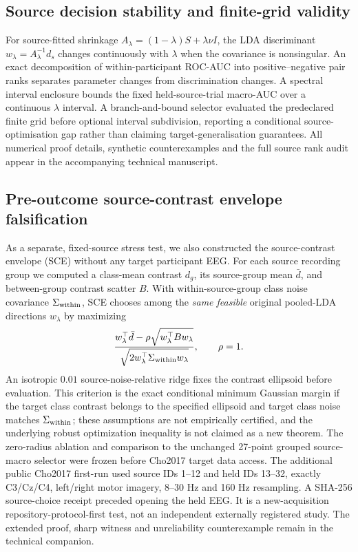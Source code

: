 \documentclass[11pt,a4paper]{article}
\begin{document}
\subsection{Source decision stability and finite-grid validity}
For source-fitted shrinkage $A_\lambda=(1-\lambda)S+\lambda\nu I$,
the LDA discriminant $w_\lambda=A_\lambda^{-1}d_s$
changes continuously with $\lambda$ when the covariance
is nonsingular. An exact decomposition of within-participant
ROC-AUC into positive--negative pair ranks separates
parameter changes from discrimination changes. A spectral
interval enclosure bounds the fixed held-source-trial
macro-AUC over a continuous $\lambda$ interval.
A branch-and-bound selector evaluated the predeclared
finite grid before optional interval subdivision,
reporting a conditional source-optimisation gap rather
than claiming target-generalisation guarantees.
All numerical proof details, synthetic counterexamples
and the full source rank audit appear in the
accompanying technical manuscript.


\subsection{Pre-outcome source-contrast envelope falsification}
\label{sec:v31-brief-method}
As a separate, fixed-source stress test, we also constructed the
source-contrast envelope (SCE) without any target participant EEG.
For each source recording group we computed a class-mean contrast
$d_g$, its source-group mean $\bar d$, and between-group
contrast scatter $B$. With within-source-group class noise
covariance $\Sigma_{\rm within}$, SCE chooses among the
\emph{same feasible} original pooled-LDA directions
$w_\lambda$ by maximizing
\[
 {w_\lambda^\top\bar d-\rho\sqrt{w_\lambda^\top B w_\lambda}
 \over\sqrt{2w_\lambda^\top\Sigma_{\rm within}w_\lambda}},
 \qquad \rho=1.
\]
An isotropic $0.01$ source-noise-relative ridge fixes the
contrast ellipsoid before evaluation. This criterion is the
exact conditional minimum Gaussian margin if the target
class contrast belongs to the specified ellipsoid and target
class noise matches $\Sigma_{\rm within}$; these assumptions
are not empirically certified, and the underlying robust
optimization inequality is not claimed as a new theorem.
The zero-radius ablation and comparison to the unchanged
27-point grouped source-macro selector were frozen
before Cho2017 target data access. The additional
public Cho2017 first-run used source IDs 1--12 and held
IDs 13--32, exactly C3/Cz/C4, left/right motor imagery,
8--30 Hz and 160 Hz resampling. A SHA-256 source-choice
receipt preceded opening the held EEG.
It is a new-acquisition repository-protocol-first test,
not an independent externally registered study.
The extended proof, sharp witness and unreliability
counterexample remain in the technical companion.
\end{document}
